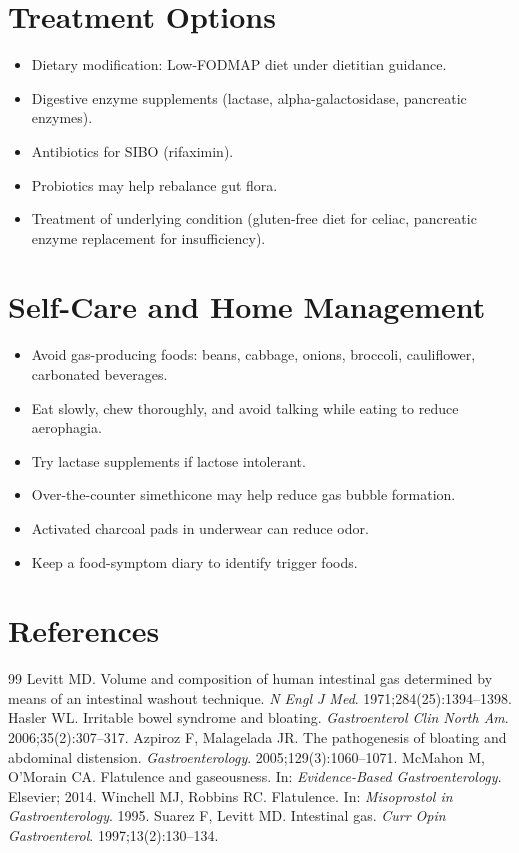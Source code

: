\section*{Treatment Options}
\begin{itemize}
  \item Dietary modification: Low-FODMAP diet under dietitian guidance.
  \item Digestive enzyme supplements (lactase, alpha-galactosidase, pancreatic enzymes).
  \item Antibiotics for SIBO (rifaximin).
  \item Probiotics may help rebalance gut flora.
  \item Treatment of underlying condition (gluten-free diet for celiac, pancreatic enzyme replacement for insufficiency).
\end{itemize}


\section*{Self-Care and Home Management}
\begin{itemize}
  \item Avoid gas-producing foods: beans, cabbage, onions, broccoli, cauliflower, carbonated beverages.
  \item Eat slowly, chew thoroughly, and avoid talking while eating to reduce aerophagia.
  \item Try lactase supplements if lactose intolerant.
  \item Over-the-counter simethicone may help reduce gas bubble formation.
  \item Activated charcoal pads in underwear can reduce odor.
  \item Keep a food-symptom diary to identify trigger foods.
\end{itemize}

\section*{References}
\begin{thebibliography}{99}
Levitt MD. Volume and composition of human intestinal gas determined by means of an intestinal washout technique. \textit{N Engl J Med}. 1971;284(25):1394--1398.
Hasler WL. Irritable bowel syndrome and bloating. \textit{Gastroenterol Clin North Am}. 2006;35(2):307--317.
Azpiroz F, Malagelada JR. The pathogenesis of bloating and abdominal distension. \textit{Gastroenterology}. 2005;129(3):1060--1071.
McMahon M, O'Morain CA. Flatulence and gaseousness. In: \textit{Evidence-Based Gastroenterology}. Elsevier; 2014.
Winchell MJ, Robbins RC. Flatulence. In: \textit{Misoprostol in Gastroenterology}. 1995.
Suarez F, Levitt MD. Intestinal gas. \textit{Curr Opin Gastroenterol}. 1997;13(2):130--134.
\end{thebibliography}
